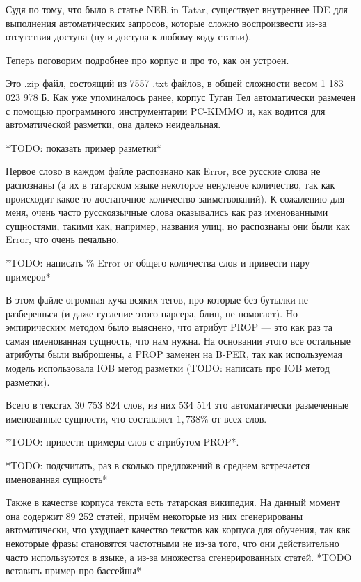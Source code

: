 Судя по тому, что было в статье NER in Tatar, существует внутреннее IDE для выполнения автоматических запросов, которые сложно воспроизвести из-за отсутствия доступа (ну и доступа к любому коду статьи).

Теперь поговорим подробнее про корпус и про то, как он устроен.

Это .zip файл, состоящий из 7557 .txt файлов, в общей сложности весом 1 183 023 978 Б. Как уже упоминалось ранее, корпус Туган Тел автоматически размечен с помощью программного инструментарии PC-KIMMO и, как водится для автоматической разметки, она далеко неидеальная. 

*TODO: показать пример разметки*

Первое слово в каждом файле распознано как Error, все русские слова не распознаны (а их в татарском языке некоторое ненулевое количество, так как происходит какое-то достаточное количество заимствований). К сожалению для меня, очень часто русскоязычные слова оказывались как раз именованными сущностями, такими как, например, названия улиц, но распознаны они были как Error, что очень печально.

*TODO: написать \% Error от общего количества слов и привести пару примеров*

В этом файле огромная куча всяких тегов, про которые без бутылки не разберешься (и даже гугление этого парсера, блин, не помогает). Но эмпирическим методом было выяснено, что атрибут PROP --- это как раз та самая именованная сущность, что нам нужна. На основании этого все остальные атрибуты были выброшены, а PROP заменен на B-PER, так как используемая модель использовала IOB метод разметки (TODO: написать про IOB метод разметки).

Всего в текстах 30 753 824 слов, из них 534 514 это автоматически размеченные именованные сущности, что составляет $1,738\%$ от всех слов. 

*TODO: привести примеры слов с атрибутом PROP*.

*TODO: подсчитать, раз в сколько предложений в среднем встречается именованная сущность*

Также в качестве корпуса текста есть татарская википедия. На данный момент она содержит 89 252 статей, причём некоторые из них сгенерированы автоматически, что ухудшает качество текстов как корпуса для обучения, так как некоторые фразы становятся частотными не из-за того, что они действительно часто используются в языке, а из-за множества сгенерированных статей. *TODO вставить пример про бассейны*

